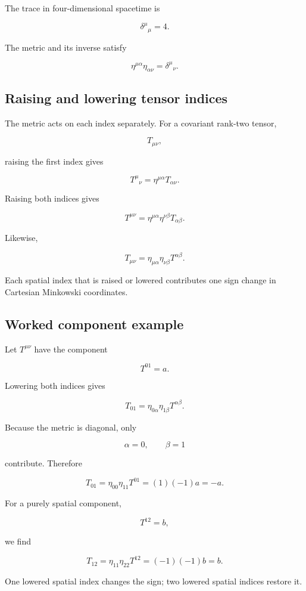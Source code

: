 The trace in four-dimensional spacetime is

\[
\delta^{\mu}{}_{\mu}=4.
\]

The metric and its inverse satisfy

\[
\eta^{\mu\alpha}\eta_{\alpha\nu}
=
\delta^{\mu}{}_{\nu}.
\]

\subsection{Raising and lowering tensor indices}

The metric acts on each index separately. For a covariant rank-two tensor,

\[
T_{\mu\nu},
\]

raising the first index gives

\[
\boxed{
T^{\mu}{}_{\nu}
=
\eta^{\mu\alpha}T_{\alpha\nu}
}.
\]

Raising both indices gives

\[
\boxed{
T^{\mu\nu}
=
\eta^{\mu\alpha}
\eta^{\nu\beta}
T_{\alpha\beta}
}.
\]

Likewise,

\[
T_{\mu\nu}
=
\eta_{\mu\alpha}
\eta_{\nu\beta}
T^{\alpha\beta}.
\]

Each spatial index that is raised or lowered contributes one sign change in Cartesian Minkowski coordinates.

\subsection{Worked component example}

Let \(T^{\mu\nu}\) have the component

\[
T^{01}=a.
\]

Lowering both indices gives

\[
T_{01}
=
\eta_{0\alpha}
\eta_{1\beta}
T^{\alpha\beta}.
\]

Because the metric is diagonal, only

\[
\alpha=0,
\qquad
\beta=1
\]

contribute. Therefore

\[
T_{01}
=
\eta_{00}
\eta_{11}
T^{01}
=
(1)(-1)a
=
-a.
\]

For a purely spatial component,

\[
T^{12}=b,
\]

we find

\[
T_{12}
=
\eta_{11}
\eta_{22}
T^{12}
=
(-1)(-1)b
=
b.
\]

One lowered spatial index changes the sign; two lowered spatial indices restore it.

